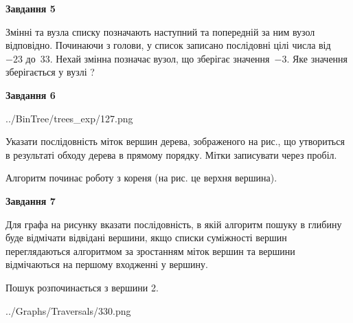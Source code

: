\documentclass[12pt, ukrainian]{article}
\begin{document}
{\begin {large}
{\begin {center}\textbf{Завдання 5}\end {center}}\par
Змінні  та  вузла списку позначають наступний та попередній за ним вузол відповідно. Починаючи з голови, у список записано послідовні цілі числа від~$-23$ до~$33$. Нехай змінна  позначає вузол, що зберігає значення~$-3$.
Яке значення зберігається у вузлі  ?\par
\newpage

{\begin {center}\textbf{Завдання 6}\end {center}}\par

\begin{center}
	{../BinTree/trees_exp/127.png}
\end{center}
Указати послідовність міток вершин дерева, зображеного на рис., що утвориться в результаті обходу дерева в прямому порядку. Мітки записувати через пробіл.\par Алгоритм починає роботу з кореня (на рис. це верхня вершина).\par
\newpage

{\begin {center}\textbf{Завдання 7}\end {center}}\par
Для графа на рисунку вказати послідовність, в якій алгоритм пошуку в глибину буде відмічати відвідані вершини, якщо списки суміжності вершин переглядаються алгоритмом за зростанням міток вершин та вершини відмічаються на першому вход\-женні у вершину.\par
Пошук розпочинається з вершини 2.\par

\begin{center}
	{../Graphs/Traversals/330.png}
\end{center}\par
\newpage


\end{large}}
\end{document}
